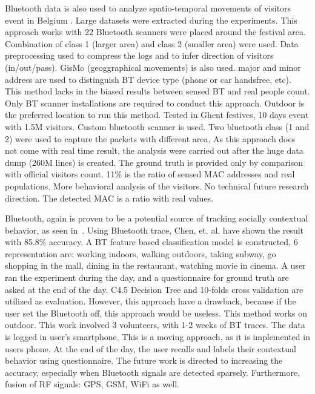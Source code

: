 \documentclass{article}
\begin{document}
Bluetooth data is also used to analyze spatio-temporal movements of visitors event in Belgium \cite{thesis016}. Large datasets were extracted during the experiments. This approach works with 22 Bluetooth scanners were placed around the festival area. Combination of class 1 (larger area) and class 2 (smaller area) were used. Data preprocessing used to compress the logs and to infer direction of visitors (in/out/pass). GisMo (geoggraphical movements) is also used. major and minor address are used to distinguish BT device type (phone or car handsfree, etc). This method lacks in the biased results between sensed BT and real people count. Only BT scanner installations are required to conduct this approach. Outdoor is the preferred location to run this method. Tested in Ghent festives, 10 days event with 1.5M visitors. Custom bluetooth scanner is used. Two bluetooth class (1 and 2) were used to capture the packets with different area. As this approach does not come with real time result, the analysis were carried out after the huge data dump (260M lines) is created. The ground truth is provided only by comparison with official visitors count. 11\% is the ratio of sensed MAC addresses and real populations. More behavioral analysis of the visitors. No technical future research direction.
The detected MAC is a ratio with real values.

Bluetooth, again is proven to be a potential source of tracking socially contextual behavior, as seen in~\cite{thesis028}. Using Bluetooth trace, Chen, et. al. have shown the result with 85.8\% accuracy.
A BT feature based classification model is constructed, 6 representation are: working indoors, walking outdoors, taking subway, go shopping in the mall, dining in the restaurant, watching movie in cinema. A user ran the experiment during the day, and a questionnaire for ground truth are asked at the end of the day.
C4.5 Decision Tree and 10-folds cross validation are utilized as evaluation.
However, this approach have a drawback, because if the user set the Bluetooth  off, this approach would be useless.
This method works on outdoor.
This work involved 3 volunteers, with 1-2 weeks of BT traces.
The data is logged in user's smartphone.
This is a moving approach, as it is implemented in users phone.
At the end of the day, the user recalls and labels their contextual behavior using questionnaire.
The future work is directed to increasing the accuracy, especially when Bluetooth signals are detected sparsely. Furthermore, fusion of RF signals: GPS, GSM, WiFi as well.
\end{document}
